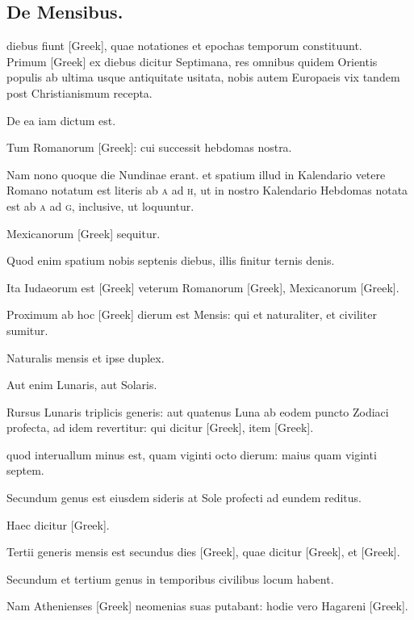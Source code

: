 \subsection{De Mensibus.}
\setcounter{parcount}{0}

 diebus fiunt \textgreek{[Greek]}, quae notationes et epochas
temporum constituunt.
\\ \p
Primum \textgreek{[Greek]} ex diebus dicitur Septimana,
res omnibus quidem Orientis populis ab ultima usque
antiquitate usitata,
 nobis autem Europaeis vix tandem post Christianismum
recepta.

De ea iam dictum est.

Tum Romanorum \textgreek{[Greek]}: cui
successit hebdomas nostra.

Nam nono quoque die Nundinae erant.
et spatium illud in Kalendario vetere Romano notatum est literis ab
\textsc{a} ad \textsc{h}, ut in nostro Kalendario Hebdomas
 notata est ab \textsc{a} ad \textsc{g}, inclusive,
ut loquuntur.

Mexicanorum \textgreek{[Greek]} sequitur.

Quod
enim spatium nobis septenis diebus, illis finitur ternis denis.

Ita Iudaeorum
est \textgreek{[Greek]} veterum Romanorum \textgreek{[Greek]}, Mexicanorum
\textgreek{[Greek]}.

Proximum ab hoc \textgreek{[Greek]} dierum est Mensis:
qui et naturaliter, et civiliter sumitur.

Naturalis mensis et ipse duplex.

Aut enim Lunaris, aut Solaris.

Rursus Lunaris triplicis generis:
aut quatenus Luna ab eodem puncto Zodiaci profecta, ad idem
revertitur: qui dicitur \textgreek{[Greek]}, item \textgreek{[Greek]}.

quod interuallum
minus est, quam viginti octo dierum: maius quam viginti septem.

Secundum genus est eiusdem sideris at Sole profecti ad eundem
reditus.

Haec dicitur \textgreek{[Greek]}.

Tertii generis mensis est secundus
dies \textgreek{[Greek]}, quae dicitur \textgreek{[Greek]},
 et \textgreek{[Greek]}.

Secundum et tertium genus in temporibus civilibus locum habent.

Nam Athenienses \textgreek{[Greek]} neomenias suas putabant: hodie vero
Hagareni \textgreek{[Greek]}.


